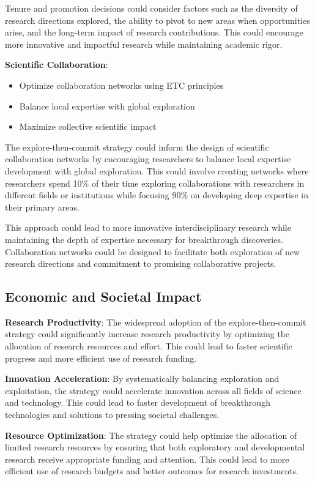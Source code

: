 \documentclass[letterpaper]{article} %
\begin{document}
Tenure and promotion decisions could consider factors such as the diversity of research directions explored, the ability to pivot to new areas when opportunities arise, and the long-term impact of research contributions. This could encourage more innovative and impactful research while maintaining academic rigor.

\textbf{Scientific Collaboration}:
\begin{itemize}
\item Optimize collaboration networks using ETC principles
\item Balance local expertise with global exploration
\item Maximize collective scientific impact
\end{itemize}

The explore-then-commit strategy could inform the design of scientific collaboration networks by encouraging researchers to balance local expertise development with global exploration. This could involve creating networks where researchers spend 10\% of their time exploring collaborations with researchers in different fields or institutions while focusing 90\% on developing deep expertise in their primary areas.

This approach could lead to more innovative interdisciplinary research while maintaining the depth of expertise necessary for breakthrough discoveries. Collaboration networks could be designed to facilitate both exploration of new research directions and commitment to promising collaborative projects.

\subsection{Economic and Societal Impact}

\textbf{Research Productivity}: The widespread adoption of the explore-then-commit strategy could significantly increase research productivity by optimizing the allocation of research resources and effort. This could lead to faster scientific progress and more efficient use of research funding.

\textbf{Innovation Acceleration}: By systematically balancing exploration and exploitation, the strategy could accelerate innovation across all fields of science and technology. This could lead to faster development of breakthrough technologies and solutions to pressing societal challenges.

\textbf{Resource Optimization}: The strategy could help optimize the allocation of limited research resources by ensuring that both exploratory and developmental research receive appropriate funding and attention. This could lead to more efficient use of research budgets and better outcomes for research investments.
\end{document}
